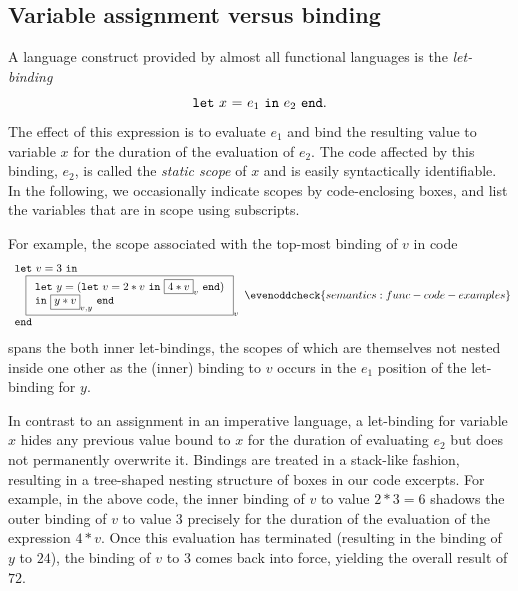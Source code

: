 \subsection{Variable assignment versus binding}
\label{section:Part1:Semantics:Binding}
A language construct provided by almost all functional languages is
the \emph{let-binding} $$\mathtt{let}\ {x}\ \mathtt{=}\ {e_1}\ \mathtt{in}\ {e_2}\ \mathtt{end}.$$ The effect of this
expression is to evaluate $e_1$ and bind the resulting value to
variable $x$ for the duration of the evaluation of $e_2$.  The code
affected by this binding, $e_2$, is called the \emph{static scope} of
$x$ and is easily syntactically identifiable.  In the following, we
occasionally indicate scopes by code-enclosing boxes, and list the
variables that are in scope using subscripts.

For example, the scope associated with the top-most binding of $v$ in
code
\begin{equation}
\label{FunctionalCodeExample1}
\begin{array}{l}
\mathtt{let}\ v = 3\ \mathtt{in}\\
\quad 
  \fbox{$
   \begin{array}[t]{l} 
    \mathtt{let}\ y = (\mathtt{let}\ v=2*v \ \mathtt{in}\ \fbox{$4*v$}_v\ \mathtt{end})\\
    \mathtt{in}\ \fbox{$y*v$}_{v,y}\ \mathtt{end}\\
\end{array}$}_v\\
\mathtt{end}
\end{array}
  \evenoddcheck{semantics:func-code-examples}
\end{equation}
spans the both inner let-bindings, the scopes of which are themselves
not nested inside one other as the (inner) binding to $v$ occurs in
the $e_1$ position of the let-binding for $y$.

In contrast to an assignment in an imperative language, a let-binding
for variable $x$ hides any previous value bound to $x$ for the
duration of evaluating $e_2$ but does not permanently overwrite
it. Bindings are treated in a stack-like fashion, resulting in a
tree-shaped nesting structure of boxes in our code excerpts.
For example, in the above code, the inner binding of $v$ to value
$2*3=6$ shadows the outer binding of $v$ to value $3$ precisely for
the duration of the evaluation of the expression $4*v$. Once this
evaluation has terminated (resulting in the binding of $y$ to $24$),
the binding of $v$ to $3$ comes back into force, yielding the overall
result of $72$.

